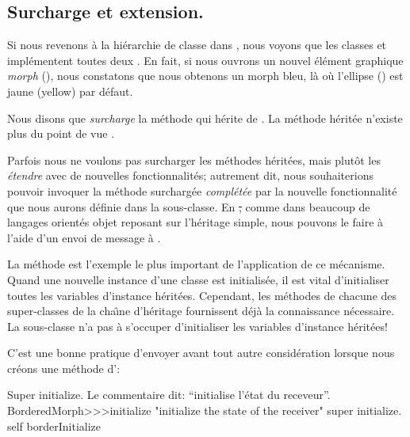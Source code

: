 \documentclass[a4paper,10pt,twoside]{book}
\begin{document}

\subsection{Surcharge et extension.}

Si nous revenons \`a la hi\'erarchie de classe  dans , nous voyons que les classes  et \mbox{} impl\'ementent toutes deux .
En fait, si nous ouvrons un nouvel \'el\'ement graphique \emph{morph} (), nous constatons que nous obtenons un morph bleu, l\`a o\`u l'ellipse () est jaune (yellow) par d\'efaut.

Nous disons que  \emph{surcharge} la m\'ethode  qui h\'erite de .
La m\'ethode h\'erit\'ee n'existe plus du point de vue .

Parfois nous ne voulons pas surcharger les m\'ethodes h\'erit\'ees, mais plut\^ot les \emph{\'etendre} avec de nouvelles fonctionnalit\'es; autrement dit, nous souhaiterions pouvoir invoquer la m\'ethode surcharg\'ee \emph{compl\'et\'ee} par la nouvelle fonctionnalit\'e que nous aurons d\'efinie dans la sous-classe.
En \st, comme dans beaucoup de langages orient\'es objet reposant sur l'h\'eritage simple, nous pouvons le faire \`a l'aide d'un envoi de message \`a \super.

La m\'ethode  est l'exemple le plus important de l'application de ce m\'ecanisme.
Quand une nouvelle instance d'une classe est initialis\'ee, il est vital
d'initialiser toutes les variables d'instance h\'erit\'ees.
Cependant, les m\'ethodes  de chacune des super-classes
de la cha\^{\i}ne d'h\'eritage fournissent d\'ej\`a la connaissance
n\'ecessaire. 
La sous-classe n'a pas \`a s'occuper d'initialiser les variables d'instance h\'erit\'ees!

C'est une bonne pratique d'envoyer  avant tout autre consid\'eration lorsque nous cr\'eons une m\'ethode d':

\begin{method}[morphinit]{Super initialize. Le commentaire dit: ``initialise l'\'etat du receveur''.}
BorderedMorph>>>initialize
	"initialize the state of the receiver"
	super initialize.
	self borderInitialize
\end{method}
\end{document}
